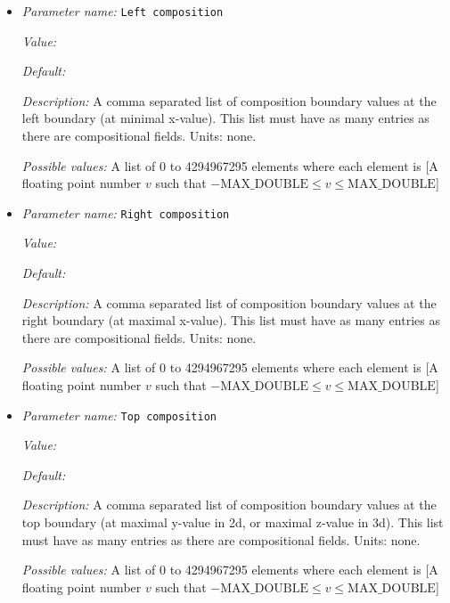 \begin{itemize}
{\it Possible values:} A list of 0 to 4294967295 elements where each element is [A floating point number $v$ such that $-\text{MAX\_DOUBLE} \leq v \leq \text{MAX\_DOUBLE}$]
\item {\it Parameter name:} {\tt Left composition}
\label{parameters:Boundary composition model/Box/Left composition}
\label{parameters:Boundary_20composition_20model/Box/Left_20composition}


{\it Value:} 


{\it Default:} 


{\it Description:} A comma separated list of composition boundary values at the left boundary (at minimal x-value). This list must have as many entries as there are compositional fields. Units: none.


{\it Possible values:} A list of 0 to 4294967295 elements where each element is [A floating point number $v$ such that $-\text{MAX\_DOUBLE} \leq v \leq \text{MAX\_DOUBLE}$]
\item {\it Parameter name:} {\tt Right composition}
\label{parameters:Boundary composition model/Box/Right composition}
\label{parameters:Boundary_20composition_20model/Box/Right_20composition}


{\it Value:} 


{\it Default:} 


{\it Description:} A comma separated list of composition boundary values at the right boundary (at maximal x-value). This list must have as many entries as there are compositional fields. Units: none.


{\it Possible values:} A list of 0 to 4294967295 elements where each element is [A floating point number $v$ such that $-\text{MAX\_DOUBLE} \leq v \leq \text{MAX\_DOUBLE}$]
\item {\it Parameter name:} {\tt Top composition}
\label{parameters:Boundary composition model/Box/Top composition}
\label{parameters:Boundary_20composition_20model/Box/Top_20composition}


{\it Value:} 


{\it Default:} 


{\it Description:} A comma separated list of composition boundary values at the top boundary (at maximal y-value in 2d, or maximal z-value in 3d). This list must have as many entries as there are compositional fields. Units: none.


{\it Possible values:} A list of 0 to 4294967295 elements where each element is [A floating point number $v$ such that $-\text{MAX\_DOUBLE} \leq v \leq \text{MAX\_DOUBLE}$]
\end{itemize}

